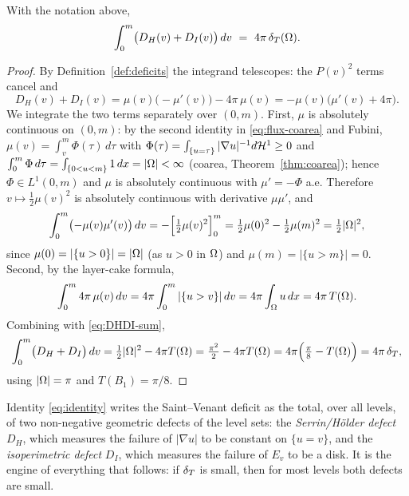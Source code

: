 \begin{theorem}\label{thm:identity}
With the notation above,
\begin{equation}\label{eq:identity}
   \int_0^m\bigl(D_H(v)+D_I(v)\bigr)\,dv\ =\ 4\pi\,\dT(\Om).
\end{equation}
\end{theorem}

\begin{proof}
By Definition~\ref{def:deficits} the integrand telescopes: the $P(v)^2$
terms cancel and
\begin{equation}\label{eq:DHDI-sum}
   D_H(v)+D_I(v)=\mu(v)\bigl(-\mu'(v)\bigr)-4\pi\,\mu(v)
   =-\mu(v)\bigl(\mu'(v)+4\pi\bigr).
\end{equation}
We integrate the two terms separately over $(0,m)$. First, $\mu$ is
absolutely continuous on $(0,m)$: by the second identity in
\eqref{eq:flux-coarea} and Fubini,
$\mu(v)=\int_v^m\Phi(\tau)\,d\tau$ with
$\Phi(\tau)=\int_{\{u=\tau\}}|\nabla u|^{-1}d\mathcal{H}^1\ge0$ and
$\int_0^m\Phi\,d\tau=\int_{\{0<u<m\}}1\,dx=|\Omega|<\infty$ (coarea,
Theorem~\ref{thm:coarea}); hence $\Phi\in L^1(0,m)$ and $\mu$ is absolutely
continuous with $\mu'=-\Phi$ a.e. Therefore $v\mapsto\tfrac12\mu(v)^2$ is
absolutely continuous with derivative $\mu\mu'$, and
\[
   \int_0^m\bigl(-\mu(v)\mu'(v)\bigr)\,dv
   =-\Bigl[\tfrac12\mu(v)^2\Bigr]_0^m
   =\tfrac12\mu(0)^2-\tfrac12\mu(m)^2
   =\tfrac12|\Omega|^2,
\]
since $\mu(0)=|\{u>0\}|=|\Omega|$ (as $u>0$ in $\Omega$) and
$\mu(m)=|\{u>m\}|=0$. Second, by the layer-cake formula,
\[
   \int_0^m 4\pi\,\mu(v)\,dv
   =4\pi\int_0^m|\{u>v\}|\,dv
   =4\pi\int_\Omega u\,dx=4\pi\,T(\Omega).
\]
Combining with \eqref{eq:DHDI-sum},
\[
   \int_0^m\bigl(D_H+D_I\bigr)\,dv
   =\tfrac12|\Omega|^2-4\pi T(\Omega)
   =\tfrac{\pi^2}{2}-4\pi T(\Omega)
   =4\pi\Bigl(\tfrac{\pi}{8}-T(\Omega)\Bigr)=4\pi\,\delta_T,
\]
using $|\Omega|=\pi$ and $T(B_1)=\pi/8$.
\end{proof}

\begin{remark}[Interpretation]\label{rem:identity}
Identity \eqref{eq:identity} writes the Saint--Venant deficit as the
total, over all levels, of two non-negative geometric defects of the level
sets: the \emph{Serrin/H\"older defect} $D_H$, which measures the failure
of $|\nabla u|$ to be constant on $\{u=v\}$, and the \emph{isoperimetric
defect} $D_I$, which measures the failure of $E_v$ to be a disk. It is the
engine of everything that follows: if $\delta_T$ is small, then for most levels
both defects are small.
\end{remark}

